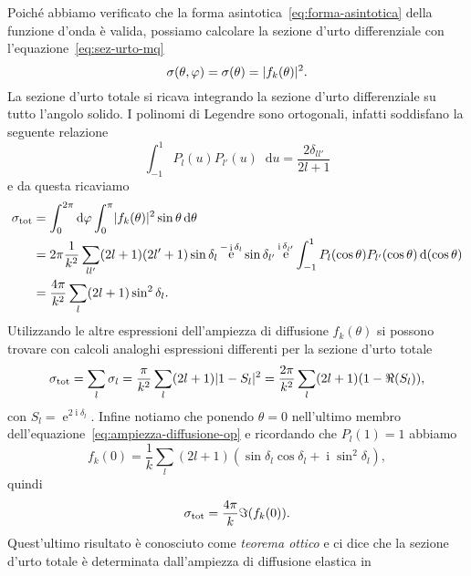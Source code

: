 \documentclass[a4paper,fleqn,twoside,12pt]{article}
\renewcommand{\phi}{\varphi}
\newcommand*{\dd}{\mathop{}\!\mathrm{d}} %
\DeclareMathOperator{\e}{\mathrm{e}} %
\DeclareMathOperator{\uimm}{\mathrm{i}} %
\DeclarePairedDelimiter{\abs}{\lvert}{\rvert}
\begin{document}
Poiché abbiamo verificato che la forma asintotica~\eqref{eq:forma-asintotica}
della funzione d'onda è valida, possiamo calcolare la sezione d'urto
differenziale con l'equazione~\eqref{eq:sez-urto-mq}
\begin{equation}
  \sigma(\theta,\phi) = \sigma(\theta) = \abs{f_{k}(\theta)}^{2}.
\end{equation}
La sezione d'urto totale si ricava integrando la sezione d'urto differenziale su
tutto l'angolo solido.  I polinomi di Legendre sono ortogonali, infatti
soddisfano la seguente relazione
\begin{equation}
  \int_{-1}^{1}P_{l}(u)P_{l'}(u)\dd u = \frac{2\delta_{ll'}}{2l+1}
\end{equation}
e da questa ricaviamo
\begin{equation}
  \label{eq:serie-sfasamenti}
  \begin{split}
    \sigma_{\textup{tot}} &= \int_{0}^{2\pi}\dd \phi \int_{0}^{\pi}
    \abs{f_{k}(\theta)}^{2} \sin\theta \dd\theta \\
    &= 2\pi \frac{1}{k^{2}} \sum_{ll'}(2l+1)(2l'+1) \sin\delta_{l} \e^{-\uimm
      \delta_{l}} \sin\delta_{l'}\e^{\uimm \delta_{l'}}
    \int_{-1}^{1}P_{l}(\cos\theta)P_{l'}(\cos\theta) \dd(\cos\theta) \\
    &= \frac{4\pi}{k^{2}} \sum_{l}(2l+1)\sin^{2}\delta_{l}.
  \end{split}
\end{equation}
Utilizzando le altre espressioni dell'ampiezza di diffusione $f_{k}(\theta)$ si
possono trovare con calcoli analoghi espressioni differenti per la sezione
d'urto totale
\begin{equation}
  \sigma_{\textup{tot}} = \sum_{l} \sigma_{l} = \frac{\pi}{k^{2}}
  \sum_{l}(2l+1)\abs{1 - S_{l}}^{2} = \frac{2\pi}{k^{2}}
  \sum_{l}(2l+1)(1-\Re(S_{l})),
\end{equation}
con $S_{l} = \e^{2\uimm\delta_{l}}$.  Infine notiamo che ponendo $\theta = 0$
nell'ultimo membro dell'equazione~\eqref{eq:ampiezza-diffusione-op} e ricordando
che $P_{l}(1) = 1$ abbiamo
\begin{equation}
  f_{k}(0) = \frac{1}{k} \sum_{l}(2l+1)(\sin\delta_{l}\cos\delta_{l} + \uimm
  \sin^{2}\delta_{l}),
\end{equation}
quindi
\begin{equation}
  \sigma_{\textup{tot}} = \frac{4\pi}{k} \Im(f_{k}(0)).
\end{equation}
Quest'ultimo risultato è conosciuto come \emph{teorema ottico} e ci dice che la
sezione d'urto totale è determinata dall'ampiezza di diffusione elastica in
\end{document}

